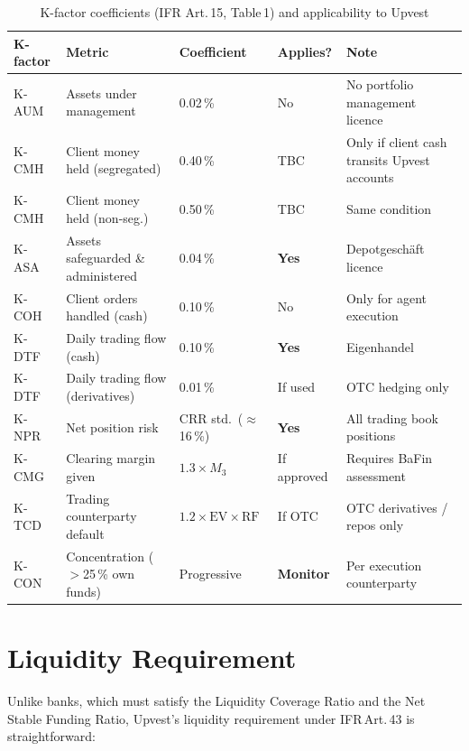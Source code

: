 \documentclass[12pt,a4paper]{report}
\begin{document}
\begin{table}[H]
\caption{K-factor coefficients (IFR Art.\,15, Table\,1) and applicability to Upvest}
\label{tab:kfactors}
\small
\begin{tabularx}{\textwidth}{@{}L{1.8cm}L{3.5cm}C{1.8cm}C{1.8cm}L{3.8cm}@{}}
\toprule
\textbf{K-factor} & \textbf{Metric} & \textbf{Coefficient} & \textbf{Applies?} & \textbf{Note} \\
\midrule
K-AUM  & Assets under management         & 0.02\,\% & No   & No portfolio management licence \\[3pt]
K-CMH  & Client money held (segregated)  & 0.40\,\% & TBC  & Only if client cash transits Upvest accounts \\[3pt]
K-CMH  & Client money held (non-seg.)    & 0.50\,\% & TBC  & Same condition \\[3pt]
K-ASA  & Assets safeguarded \& administered & 0.04\,\% & \textbf{Yes} & Depotgesch{\"a}ft licence \\[3pt]
K-COH  & Client orders handled (cash)    & 0.10\,\% & No   & Only for agent execution \\[3pt]
K-DTF  & Daily trading flow (cash)       & 0.10\,\% & \textbf{Yes} & Eigenhandel \\[3pt]
K-DTF  & Daily trading flow (derivatives) & 0.01\,\% & If used & OTC hedging only \\[3pt]
K-NPR  & Net position risk               & CRR std.\ ($\approx$16\,\%) & \textbf{Yes} & All trading book positions \\[3pt]
K-CMG  & Clearing margin given           & $1.3 \times M_{3}$ & If approved & Requires BaFin assessment \\[3pt]
K-TCD  & Trading counterparty default    & $1.2 \times \text{EV} \times \text{RF}$ & If OTC & OTC derivatives / repos only \\[3pt]
K-CON  & Concentration ($>$25\,\% own funds) & Progressive & \textbf{Monitor} & Per execution counterparty \\
\bottomrule
\end{tabularx}
\end{table}

\section{Liquidity Requirement}

Unlike banks, which must satisfy the Liquidity Coverage Ratio and the Net Stable Funding
Ratio, Upvest's liquidity requirement under IFR\,Art.\,43 is straightforward:
\end{document}
